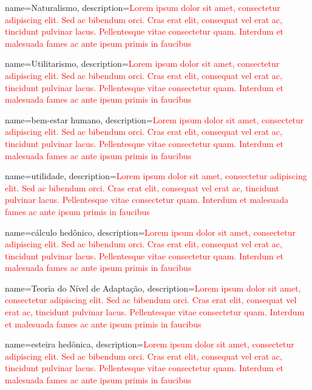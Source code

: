 {
	name=Naturalismo,
	description={\textcolor{red}{Lorem ipsum dolor sit amet, consectetur adipiscing elit. Sed ac bibendum orci. Cras erat elit, consequat vel erat ac, tincidunt pulvinar lacus. Pellentesque vitae consectetur quam. Interdum et malesuada fames ac ante ipsum primis in faucibus}}
}

{
	name=Utilitarismo,
	description={\textcolor{red}{Lorem ipsum dolor sit amet, consectetur adipiscing elit. Sed ac bibendum orci. Cras erat elit, consequat vel erat ac, tincidunt pulvinar lacus. Pellentesque vitae consectetur quam. Interdum et malesuada fames ac ante ipsum primis in faucibus}}
}

{
	name=bem-estar humano,
	description={\textcolor{red}{Lorem ipsum dolor sit amet, consectetur adipiscing elit. Sed ac bibendum orci. Cras erat elit, consequat vel erat ac, tincidunt pulvinar lacus. Pellentesque vitae consectetur quam. Interdum et malesuada fames ac ante ipsum primis in faucibus}}
}

{
	name=utilidade,
	description={\textcolor{red}{Lorem ipsum dolor sit amet, consectetur adipiscing elit. Sed ac bibendum orci. Cras erat elit, consequat vel erat ac, tincidunt pulvinar lacus. Pellentesque vitae consectetur quam. Interdum et malesuada fames ac ante ipsum primis in faucibus}}
}

{
	name=cálculo hedônico,
	description={\textcolor{red}{Lorem ipsum dolor sit amet, consectetur adipiscing elit. Sed ac bibendum orci. Cras erat elit, consequat vel erat ac, tincidunt pulvinar lacus. Pellentesque vitae consectetur quam. Interdum et malesuada fames ac ante ipsum primis in faucibus}}
}

{
	name=Teoria do Nível de Adaptação,
	description={\textcolor{red}{Lorem ipsum dolor sit amet, consectetur adipiscing elit. Sed ac bibendum orci. Cras erat elit, consequat vel erat ac, tincidunt pulvinar lacus. Pellentesque vitae consectetur quam. Interdum et malesuada fames ac ante ipsum primis in faucibus}}
}

{
	name=esteira hedônica,
	description={\textcolor{red}{Lorem ipsum dolor sit amet, consectetur adipiscing elit. Sed ac bibendum orci. Cras erat elit, consequat vel erat ac, tincidunt pulvinar lacus. Pellentesque vitae consectetur quam. Interdum et malesuada fames ac ante ipsum primis in faucibus}}
}

